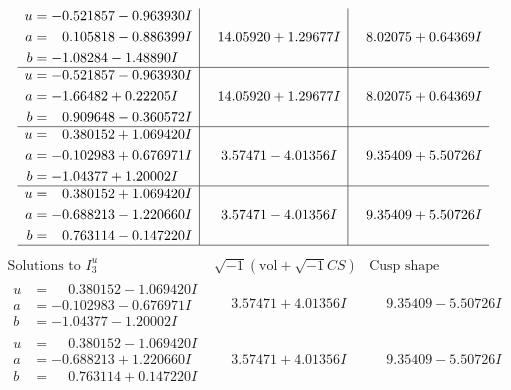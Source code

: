 \documentclass[1p]{elsarticle_modified}
\theoremstyle{definition}
\newcommand{\I}{\sqrt{-1}}
\begin{document}
$$\begin{array}{c|c|c}
\begin{aligned}
u &= -0.521857 - 0.963930 I \\
a &= \phantom{-}0.105818 - 0.886399 I \\
b &= -1.08284 - 1.48890 I\end{aligned}
 & \phantom{-}14.05920 + 1.29677 I & \phantom{-}8.02075 + 0.64369 I \\ \hline\begin{aligned}
u &= -0.521857 - 0.963930 I \\
a &= -1.66482 + 0.22205 I \\
b &= \phantom{-}0.909648 - 0.360572 I\end{aligned}
 & \phantom{-}14.05920 + 1.29677 I & \phantom{-}8.02075 + 0.64369 I \\ \hline\begin{aligned}
u &= \phantom{-}0.380152 + 1.069420 I \\
a &= -0.102983 + 0.676971 I \\
b &= -1.04377 + 1.20002 I\end{aligned}
 & \phantom{-}3.57471 - 4.01356 I & \phantom{-}9.35409 + 5.50726 I \\ \hline\begin{aligned}
u &= \phantom{-}0.380152 + 1.069420 I \\
a &= -0.688213 - 1.220660 I \\
b &= \phantom{-}0.763114 - 0.147220 I\end{aligned}
 & \phantom{-}3.57471 - 4.01356 I & \phantom{-}9.35409 + 5.50726 I\\
 \hline 
 \end{array}$$\newpage$$\begin{array}{c|c|c}  
\text{Solutions to }I^u_{3}& \I (\text{vol} + \sqrt{-1}CS) & \text{Cusp shape}\\
 \hline 
\begin{aligned}
u &= \phantom{-}0.380152 - 1.069420 I \\
a &= -0.102983 - 0.676971 I \\
b &= -1.04377 - 1.20002 I\end{aligned}
 & \phantom{-}3.57471 + 4.01356 I & \phantom{-}9.35409 - 5.50726 I \\ \hline\begin{aligned}
u &= \phantom{-}0.380152 - 1.069420 I \\
a &= -0.688213 + 1.220660 I \\
b &= \phantom{-}0.763114 + 0.147220 I\end{aligned}
 & \phantom{-}3.57471 + 4.01356 I & \phantom{-}9.35409 - 5.50726 I \\ \hline\begin{aligned}

\end{aligned}
\end{array}$$
\end{document}
